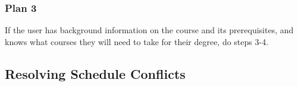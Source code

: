 \documentclass{article}
\begin{document}
\subsubsection{Plan 3}
    If the user has background information on the course and its prerequisites, and knows what courses they will need to take for their degree, do steps 3-4.
    






\subsection{Resolving Schedule Conflicts}
\vspace{1ex}
\end{document}
